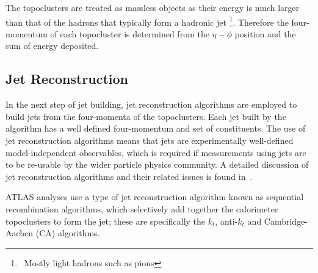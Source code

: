 The topoclusters are treated as massless objects as their energy is much larger than that of the hadrons that typically form a hadronic jet \footnote{\ Mostly light hadrons such as pions}.
Therefore the four-momentum of each topocluster is determined from the $\eta-\phi$ position and the sum of energy deposited.

\subsection{Jet Reconstruction}
\label{sec:obj-jets_reco}

In the next step of jet building, jet reconstruction algorithms are employed to build jets from
the four-momenta of the topoclusters.
Each jet built by the algorithm has a well defined four-momentum and set of constituents.
The use of jet reconstruction algorithms means that jets are experimentally well-defined model-independent observables,
which is required if measurements using jets are to be re-usable by the wider particle physics community.
A detailed discussion of jet reconstruction algorithms
and their related issues is found in~\cite{obj-jets_reco_salam}.

ATLAS analyses use a type of jet reconstruction algorithm known as sequential recombination algorithms,
which selectively add together the calorimeter topoclusters to form the jet;
these are specifically the $k_t$, anti-$k_t$ and Cambridge-Aachen (CA) algorithms.

